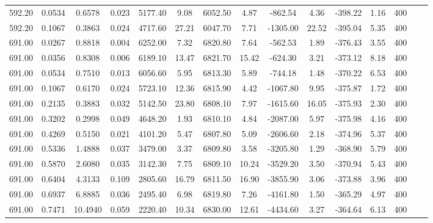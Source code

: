 \documentclass[%
 aip,
 jcp,
 sd,%
 amsmath,amssymb,
]{revtex4-1}
\begin{document}
\begin{table*}[!htbp]
\begin{ruledtabular}
\begin{tabular}{ccccccccccccccc}
592.20	&	0.0534	&	0.6578	&	0.023	&	5177.40	&	9.08	&	6052.50	&	4.87	&	-862.54	&	4.36	&	-398.22	&	1.16	&	400	\\
592.20	&	0.1067	&	0.3863	&	0.024	&	4717.60	&	27.21	&	6047.70	&	7.71	&	-1305.00	&	22.52	&	-395.04	&	5.35	&	400	\\
691.00	&	0.0267	&	0.8818	&	0.004	&	6252.00	&	7.32	&	6820.80	&	7.64	&	-562.53	&	1.89	&	-376.43	&	3.55	&	400	\\
691.00	&	0.0356	&	0.8308	&	0.006	&	6189.10	&	13.47	&	6821.70	&	15.42	&	-624.30	&	3.21	&	-373.12	&	8.18	&	400	\\
691.00	&	0.0534	&	0.7510	&	0.013	&	6056.60	&	5.95	&	6813.30	&	5.89	&	-744.18	&	1.48	&	-370.22	&	6.53	&	400	\\
691.00	&	0.1067	&	0.6170	&	0.024	&	5723.10	&	12.36	&	6815.90	&	4.42	&	-1067.80	&	9.95	&	-375.87	&	1.72	&	400	\\
691.00	&	0.2135	&	0.3883	&	0.032	&	5142.50	&	23.80	&	6808.10	&	7.97	&	-1615.60	&	16.05	&	-375.93	&	2.30	&	400	\\
691.00	&	0.3202	&	0.2998	&	0.049	&	4648.20	&	1.93	&	6810.10	&	4.84	&	-2087.00	&	5.97	&	-375.98	&	4.16	&	400	\\
691.00	&	0.4269	&	0.5150	&	0.021	&	4101.20	&	5.47	&	6807.80	&	5.09	&	-2606.60	&	2.18	&	-374.96	&	5.37	&	400	\\
691.00	&	0.5336	&	1.4888	&	0.037	&	3479.00	&	3.37	&	6809.80	&	3.58	&	-3205.80	&	1.29	&	-368.90	&	5.79	&	400	\\
691.00	&	0.5870	&	2.6080	&	0.035	&	3142.30	&	7.75	&	6809.10	&	10.24	&	-3529.20	&	3.50	&	-370.94	&	5.43	&	400	\\
691.00	&	0.6404	&	4.3133	&	0.109	&	2805.60	&	16.79	&	6811.50	&	16.90	&	-3855.90	&	3.06	&	-373.88	&	3.96	&	400	\\
691.00	&	0.6937	&	6.8885	&	0.036	&	2495.40	&	6.98	&	6819.80	&	7.26	&	-4161.80	&	1.50	&	-365.29	&	4.97	&	400	\\
691.00	&	0.7471	&	10.4940	&	0.059	&	2220.40	&	10.34	&	6830.00	&	12.61	&	-4434.60	&	3.27	&	-364.64	&	6.13	&	400	\\
\end{tabular}
\end{ruledtabular}
\end{table*}
\end{document}
